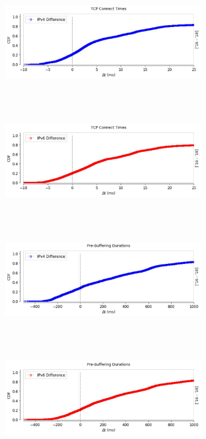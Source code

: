 \begin{figure}
	\centering
	\begin{minipage}{0.5\textwidth}
		\centering
		\includegraphics[keepaspectratio, height=5cm, width=8.5cm]{figures/cache/btuk/netflix-syn-diff-2856-cdf-v4.pdf}
	\end{minipage}
	\begin{minipage}{0.5\textwidth}
		\centering
		\includegraphics[keepaspectratio, height=5cm, width=8.5cm]{figures/cache/btuk/netflix-syn-diff-2856-cdf-v6.pdf}
	\end{minipage}
	\begin{minipage}{0.5\textwidth}
		\centering
		\includegraphics[keepaspectratio, height=5cm, width=8.5cm]{figures/cache/btuk/netflix-pd-diff-2856-cdf-v4.pdf}
	\end{minipage}
	\begin{minipage}{0.5\textwidth}
		\centering
		\includegraphics[keepaspectratio, height=5cm, width=8.5cm]{figures/cache/btuk/netflix-pd-diff-2856-cdf-v6.pdf}

\end{minipage}
\end{figure}
